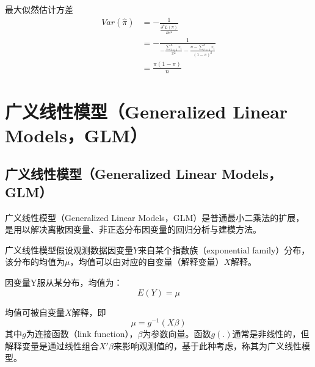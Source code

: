 最大似然估计方差
\begin{equation}
    \begin{aligned}
        Var(\hat{\pi}) & = -\frac{1}{\frac{\partial^2 L(\pi)}{\partial \pi^2}}                                             \\
                       & = -\frac{1}{-\frac{\sum\limits_{i=1}^n x_i}{\pi^2} - \frac{n-\sum\limits_{i=1}^n x_i}{(1-\pi)^2}} \\
                       & = \frac{\pi(1-\pi)}{n}
    \end{aligned}
\end{equation}

\section{广义线性模型（Generalized Linear Models，GLM）}

\subsection{广义线性模型（Generalized Linear Models，GLM）}

广义线性模型（Generalized Linear Models，GLM）是普通最小二乘法的扩展，是用以解决离散因变量、非正态分布因变量的回归分析与建模方法。

广义线性模型假设观测数据因变量$Y$来自某个指数族（exponential family）分布，该分布的均值为$\mu$，均值可以由对应的自变量（解释变量）$X$解释。

因变量Y服从某分布，均值为：
\begin{equation}
    E(Y) = \mu
\end{equation}

均值可被自变量$X$解释，即
\begin{equation}
    \mu = g^{-1}(X\beta)
\end{equation}
其中$g$为连接函数（link function），$\beta$为参数向量。函数$g(.)$通常是非线性的，但解释变量是通过线性组合$X'β$来影响观测值的，基于此种考虑，称其为广义线性模型。


